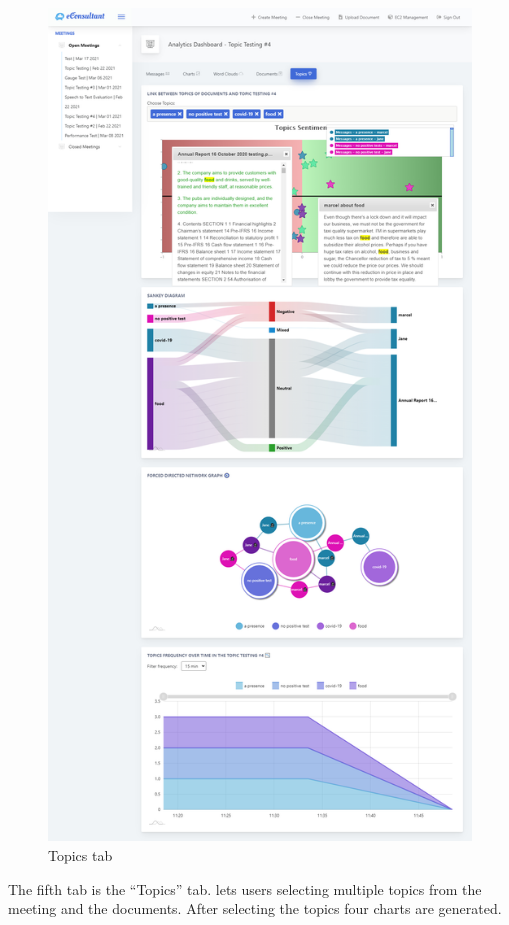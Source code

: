 \documentclass{article}
\begin{document}
\begin{figure}[H]
  \centering
  \includegraphics[scale=0.21]{implementation/topicsTab.jpg}
  \caption{Topics tab}
  \label{fig:topicsTab}
\end{figure}

{\large 
The fifth tab is the ``Topics'' tab.  lets users selecting multiple topics from the meeting and the documents. After selecting the topics four charts are generated.\par
}
\end{document}
